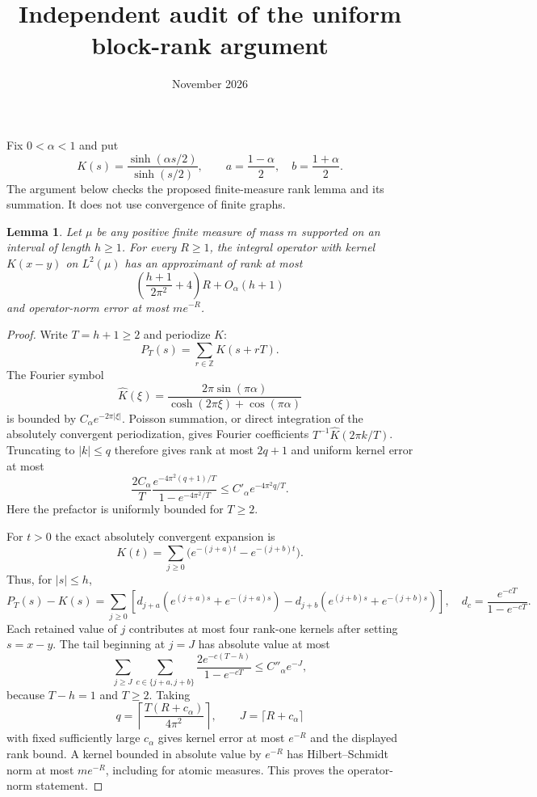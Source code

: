 \documentclass[11pt]{article}
\title{Independent audit of the uniform block-rank argument}
\date{November 2026}
\newtheorem{lemma}{Lemma}
\begin{document}
\maketitle

Fix $0<\alpha<1$ and put
\[
 K(s)=\frac{\sinh(\alpha s/2)}{\sinh(s/2)},\qquad
 a=\frac{1-\alpha}{2},\quad b=\frac{1+\alpha}{2}.
\]
The argument below checks the proposed finite-measure rank lemma and
its summation. It does not use convergence of finite graphs.

\begin{lemma}
Let $\mu$ be any positive finite measure of mass $m$ supported on an
interval of length $h\ge1$. For every $R\ge1$, the integral operator
with kernel $K(x-y)$ on $L^2(\mu)$ has an approximant of rank at most
\[
 \left(\frac{h+1}{2\pi^2}+4\right)R+O_\alpha(h+1)
\]
and operator-norm error at most $m e^{-R}$.
\end{lemma}
\begin{proof}
Write $T=h+1\ge2$ and periodize $K$:
\[
 P_T(s)=\sum_{r\in\mathbb Z}K(s+rT).
\]
The Fourier symbol
\[
 \widehat K(\xi)=
 \frac{2\pi\sin(\pi\alpha)}{\cosh(2\pi\xi)+\cos(\pi\alpha)}
\]
is bounded by $C_\alpha e^{-2\pi|\xi|}$. Poisson summation, or direct
integration of the absolutely convergent periodization, gives Fourier
coefficients $T^{-1}\widehat K(2\pi k/T)$. Truncating to $|k|\le q$
therefore gives rank at most $2q+1$ and uniform kernel error at most
\[
 \frac{2C_\alpha}{T}
 \frac{e^{-4\pi^2(q+1)/T}}{1-e^{-4\pi^2/T}}
 \le C'_\alpha e^{-4\pi^2q/T}.
\]
Here the prefactor is uniformly bounded for $T\ge2$.

For $t>0$ the exact absolutely convergent expansion is
\[
 K(t)=\sum_{j\ge0}\bigl(e^{-(j+a)t}-e^{-(j+b)t}\bigr).
\]
Thus, for $|s|\le h$,
\[
 P_T(s)-K(s)=\sum_{j\ge0}\left[
 d_{j+a}(e^{(j+a)s}+e^{-(j+a)s})
 -d_{j+b}(e^{(j+b)s}+e^{-(j+b)s})\right],\quad
 d_c=\frac{e^{-cT}}{1-e^{-cT}}.
\]
Each retained value of $j$ contributes at most four rank-one kernels
after setting $s=x-y$. The tail beginning at $j=J$ has absolute value
at most
\[
 \sum_{j\ge J}\sum_{c\in\{j+a,j+b\}}
 \frac{2e^{-c(T-h)}}{1-e^{-cT}}
 \le C''_\alpha e^{-J},
\]
because $T-h=1$ and $T\ge2$. Taking
\[
 q=\left\lceil\frac{T(R+c_\alpha)}{4\pi^2}\right\rceil,
 \qquad J=\lceil R+c_\alpha\rceil
\]
with fixed sufficiently large $c_\alpha$ gives kernel error at most
$e^{-R}$ and the displayed rank bound. A kernel bounded in absolute
value by $e^{-R}$ has Hilbert--Schmidt norm at most $m e^{-R}$,
including for atomic measures. This proves the operator-norm statement.
\end{proof}
\end{document}
